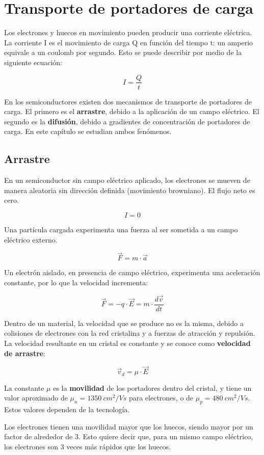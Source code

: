 \chapter{Transporte de portadores de carga}

Los electrones y huecos en movimiento pueden producir una corriente eléctrica. La corriente I es el movimiento de carga Q en función del tiempo t: un amperio equivale a un coulomb por segundo. Esto se puede describir por medio de la siguiente ecuación:

\[ I = \dfrac{Q}{t} \]

En los semiconductores existen dos mecanismos de transporte de portadores de carga. El primero es el \textbf{arrastre}, debido a la aplicación de un campo eléctrico. El segundo es la \textbf{difusión}, debido a gradientes de concentración de portadores de carga. En este capítulo se estudian ambos fenómenos.

\section{Arrastre}

En un semiconductor sin campo eléctrico aplicado, los electrones se mueven de manera aleatoria sin dirección definida (movimiento browniano). El flujo neto es cero.

\[ I = 0 \]

Una partícula cargada experimenta una fuerza al ser sometida a un campo eléctrico externo.

\[ \vec{F} = m \cdot \vec{a} \]

Un electrón aislado, en presencia de campo eléctrico, experimenta una aceleración constante, por lo que la velocidad incrementa:

\[ \vec{F} = -q \cdot \vec{E} = m \cdot \dfrac{d\vec{v}}{dt} \]

Dentro de un material, la velocidad que se produce no es la misma, debido a colisiones de electrones con la red cristalina y a fuerzas de atracción y repulsión. La velocidad resultante en un cristal es constante y se conoce como \textbf{velocidad de arrastre}:

\[ \vec{v}_d = \mu \cdot \vec{E} \]

La constante $\mu$ es la \textbf{movilidad} de los portadores dentro del cristal, y tiene un valor aproximado de $\mu_n = 1350\ cm^2/Vs$ para electrones, o de $\mu_p = 480\ cm^2/Vs$. Estos valores dependen de la tecnología.

Los electrones tienen una movilidad mayor que los huecos, siendo mayor por un factor de alrededor de 3. Esto quiere decir que, para un mismo campo eléctrico, los electrones son 3 veces más rápidos que los huecos.

